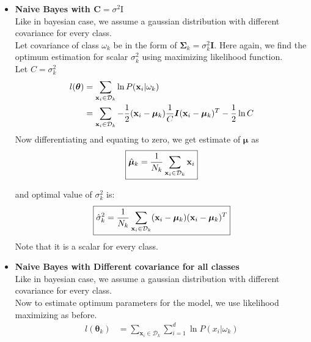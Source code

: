 \documentclass[11pt,paper=a4,answers]{exam}
\renewcommand{\vec}[1]{\mathbf{#1}}
\begin{document}
\begin{questions}
\begin{enumerate}[i.]
            \begin{itemize}
                \item \textbf{Naive Bayes with $\bm{C} = \sigma ^2 \bm{\mathrm{I}}$}\\
                Like in bayesian case, we assume a gaussian distribution with different covariance for every class.\\
                Let covariance of class $\omega_k$ be in the form of $\bm{\Sigma}_k = \sigma_k ^2 \bm{I}$. Here again, we find the optimum estimation for scalar $\sigma_k ^2$ using maximizing likelihood function.\\
                Let $C = \sigma_k^2$
                \begin{align*}
                    l(\bm{\theta}) &= \sum_{\vec{x}_i \in \mathcal{D}_k} \ln P(\vec{x}_i| \omega_k) \\
                    &= \sum_{\vec{x}_i \in \mathcal{D}_k} -{1 \over 2} (\vec{x}_i - \bm{\mu}_k){1 \over C}\bm{I} (\vec{x}_i - \bm{\mu}_k)^T -{1 \over 2} \ln C
                \end{align*}
                Now differentiating and equating to zero, we get estimate of $\bm{\mu}$ as
                $$\boxed{\hat{\bm{\mu}}_k = {1 \over N_k} \sum_{\vec{x}_i \in \mathcal{D}_k} \vec{x}_i }$$

                and optimal value of $\sigma_k ^2$ is:
                \begin{align}
                    \boxed{\hat{\sigma}_k ^2 = {1 \over N_k} \sum_{\vec{x}_i \in \mathcal{D}_k} (\vec{x}_i - \bm{\mu}_k) (\vec{x}_i - \bm{\mu}_k)^T}
                \end{align}
                Note that it is a scalar for every class.


                \item \textbf{Naive Bayes with Different covariance for all classes}\\
                Like in bayesian case, we assume a gaussian distribution with different covariance for every class.\\
                Now to estimate optimum parameters for the model, we use likelihood maximizing as before.
                \begin{align*}
                    l(\bm{\theta}_k) &= \sum_{\vec{x}_i \in \mathcal{D}_k} \sum_{i=1}^d \ln P(x_i| \omega_k)\\
                \end{align*}
                

\end{itemize}
\end{enumerate}
\end{questions}
\end{document}
